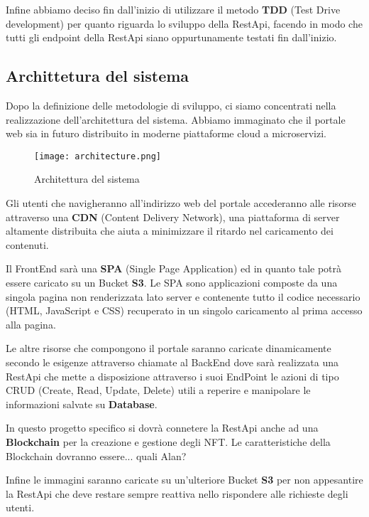 Infine abbiamo deciso fin dall'inizio di utilizzare il metodo \textbf{TDD} (Test Drive development) per quanto riguarda lo sviluppo della RestApi,
facendo in modo che tutti gli endpoint della RestApi siano oppurtunamente testati fin dall'inizio.

\clearpage

\subsection{Archittetura del sistema}
Dopo la definizione delle metodologie di sviluppo, ci siamo concentrati nella realizzazione dell'architettura del sistema.
Abbiamo immaginato che il portale web sia in futuro distribuito in moderne piattaforme cloud a microservizi.

\begin{figure}[H]
	\centering
	\texttt{[image: architecture.png]}
	\caption{Architettura del sistema}
	\label{fig:architecture}
\end{figure}

Gli utenti che navigheranno all'indirizzo web del portale accederanno alle risorse attraverso una \textbf{CDN} (Content Delivery Network),
una piattaforma di server altamente distribuita che aiuta a minimizzare il ritardo nel caricamento dei contenuti.

Il FrontEnd sarà una \textbf{SPA} (Single Page Application) ed in quanto tale potrà essere caricato su un Bucket \textbf{S3}. 
Le SPA sono applicazioni composte da una singola pagina non renderizzata lato server e
contenente tutto il codice necessario (HTML, JavaScript e CSS) recuperato in un singolo caricamento al prima accesso alla pagina.

Le altre risorse che compongono il portale saranno caricate dinamicamente secondo le esigenze attraverso chiamate al BackEnd dove sarà realizzata una RestApi 
che mette a disposizione attraverso i suoi EndPoint le azioni di tipo CRUD (Create, Read, Update, Delete) 
utili a reperire e manipolare le informazioni salvate su \textbf{Database}.

In questo progetto specifico si dovrà connetere la RestApi anche ad una \textbf{Blockchain} per la creazione e gestione degli NFT.
Le caratteristiche della Blockchain dovranno essere... quali Alan?

Infine le immagini saranno caricate su un'ulteriore Bucket \textbf{S3} per non appesantire la RestApi 
che deve restare sempre reattiva nello rispondere alle richieste degli utenti.

